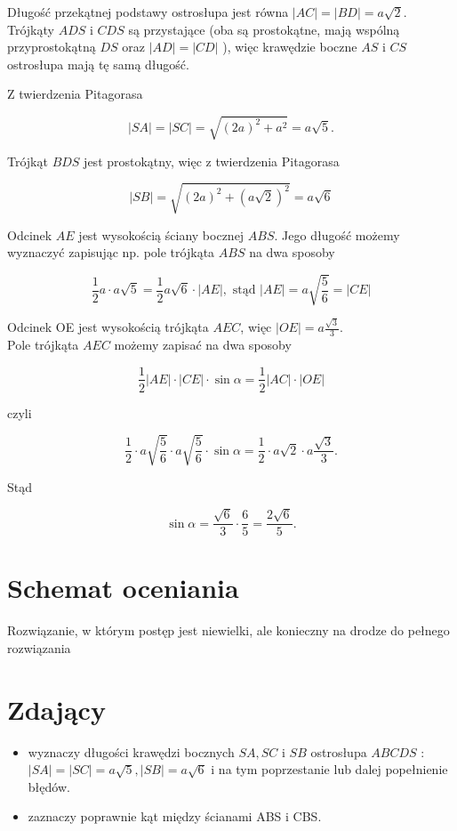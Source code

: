 \documentclass[10pt]{article}
\begin{document}
Długość przekątnej podstawy ostrosłupa jest równa $|A C|=|B D|=a \sqrt{2}$.\\
Trójkąty $A D S$ i $C D S$ są przystające (oba są prostokątne, mają wspólną przyprostokątną $D S$ oraz $|A D|=|C D|$ ), więc krawędzie boczne $A S$ i $C S$ ostrosłupa mają tę samą długość.

Z twierdzenia Pitagorasa

$$
|S A|=|S C|=\sqrt{(2 a)^{2}+a^{2}}=a \sqrt{5} .
$$

Trójkąt $B D S$ jest prostokątny, więc z twierdzenia Pitagorasa

$$
|S B|=\sqrt{(2 a)^{2}+(a \sqrt{2})^{2}}=a \sqrt{6}
$$

Odcinek $A E$ jest wysokością ściany bocznej $A B S$. Jego długość możemy wyznaczyć zapisując np. pole trójkąta $A B S$ na dwa sposoby

$$
\frac{1}{2} a \cdot a \sqrt{5}=\frac{1}{2} a \sqrt{6} \cdot|A E|, \text { stąd }|A E|=a \sqrt{\frac{5}{6}}=|C E|
$$

Odcinek OE jest wysokością trójkąta $A E C$, więc $|O E|=a \frac{\sqrt{3}}{3}$.\\
Pole trójkąta $A E C$ możemy zapisać na dwa sposoby

$$
\frac{1}{2}|A E| \cdot|C E| \cdot \sin \alpha=\frac{1}{2}|A C| \cdot|O E|
$$

czyli

$$
\frac{1}{2} \cdot a \sqrt{\frac{5}{6}} \cdot a \sqrt{\frac{5}{6}} \cdot \sin \alpha=\frac{1}{2} \cdot a \sqrt{2} \cdot a \frac{\sqrt{3}}{3} .
$$

Stąd

$$
\sin \alpha=\frac{\sqrt{6}}{3} \cdot \frac{6}{5}=\frac{2 \sqrt{6}}{5} .
$$

\section*{Schemat oceniania}
Rozwiązanie, w którym postęp jest niewielki, ale konieczny na drodze do pełnego rozwiązania

\section*{Zdający}
\begin{itemize}
  \item wyznaczy długości krawędzi bocznych $S A, S C$ i $S B$ ostrosłupa $A B C D S$ :\\
$|S A|=|S C|=a \sqrt{5},|S B|=a \sqrt{6}$ i na tym poprzestanie lub dalej popełnienie błędów.
  \item zaznaczy poprawnie kąt między ścianami ABS i CBS.
\end{itemize}
\end{document}
